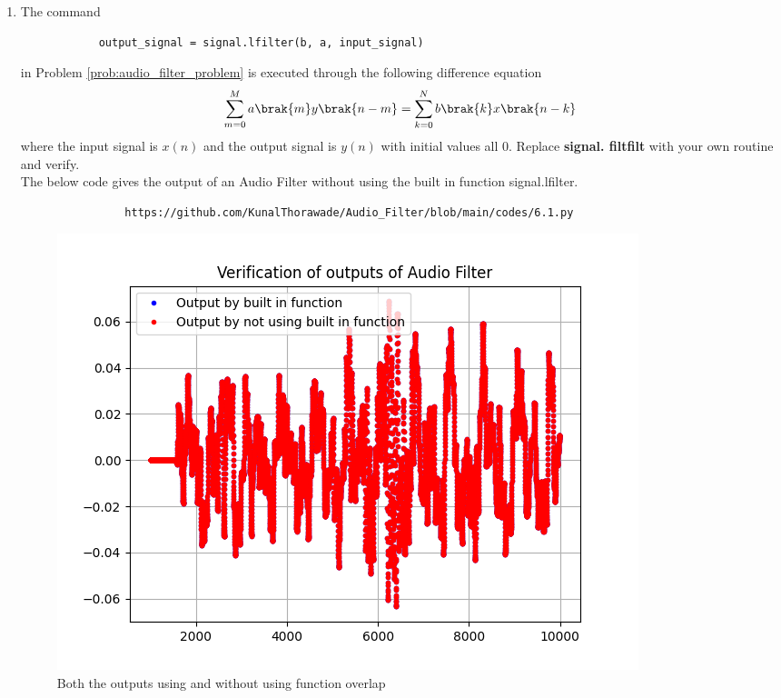\documentclass[journal,12pt,twocolumn]{IEEEtran}
\theoremstyle{remark}
\begin{document}
\begin{enumerate}[label=\thesection.\arabic*]
	\item
		The command
		\begin{lstlisting}
			output_signal = signal.lfilter(b, a, input_signal)
				\end{lstlisting}
				in Problem \ref{prob:audio_filter_problem} is executed through the following difference equation
				\begin{equation}
					\label{eq:iir_filter_gen}
					 \sum _{m=0}^{M}a\brak{m}y\brak{n-m}=\sum _{k=0}^{N}b\brak{k}x\brak{n-k} 
				\end{equation}
				where the input signal is $x(n)$ and the output signal is $y(n)$ with initial values all 0. Replace
				\textbf{signal. filtfilt} with your own routine and verify.\\

				\solution The below code gives the output of an Audio Filter without using the built in function signal.lfilter.
				\begin{lstlisting}
				https://github.com/KunalThorawade/Audio_Filter/blob/main/codes/6.1.py
				\end{lstlisting}
				\begin{figure}[H]
					\centering
					\includegraphics[width=\columnwidth]{figs/Audio_Filter_verf.png}
					\caption{Both the outputs using and without using function overlap}
					\label{fig:6.1}
				\end{figure}






\end{enumerate}
\end{document}
